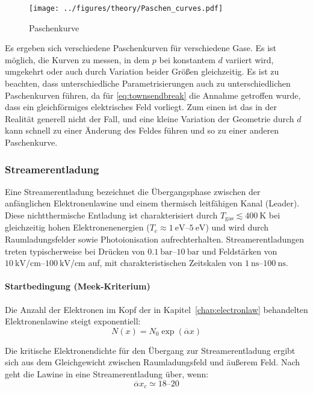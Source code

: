   \begin{figure}[htbp]
    \centering
    \texttt{[image: ../figures/theory/Paschen\_curves.pdf]}
    \caption{Paschenkurve}
    \label{fig:paschencurve}
  \end{figure}

Es ergeben sich verschiedene Paschenkurven für verschiedene Gase. Es ist möglich, die Kurven zu messen, in dem \(p\) bei konstantem \(d\) variiert wird, umgekehrt oder auch durch Variation beider Größen gleichzeitig. Es ist zu beachten, dass unterschiedliche Parametrisierungen auch zu unterschiedlichen Paschenkurven führen, da für \eqref{eq:townsendbreak} die Annahme getroffen wurde, dass ein gleichförmiges elektrisches Feld vorliegt. Zum einen ist das in der Realität generell nicht der Fall, und eine kleine Variation der Geometrie durch \(d\) kann schnell zu einer Änderung des Feldes führen und so zu einer anderen Paschenkurve. \cite{kuffel2000}


\subsubsection{Streamerentladung}
\label{sec:streamerdischarge}
Eine Streamerentladung bezeichnet die Übergangsphase zwischen der anfänglichen Elektronenlawine und einem thermisch leitfähigen Kanal (Leader). Diese nichtthermische Entladung ist charakterisiert durch $T_{\text{gas}} \lesssim \SI{400}{\kelvin}$ bei gleichzeitig hohen Elektronenenergien ($T_e \approx \SIrange{1}{5}{\electronvolt}$) und wird durch Raumladungsfelder sowie Photoionisation aufrechterhalten. Streamerentladungen treten typischerweise bei Drücken von $\SIrange{0.1}{10}{\bar}$ und Feldstärken von $\SIrange{10}{100}{\kilo\volt\per\centi\meter}$ auf, mit charakteristischen Zeitskalen von $\SIrange{1}{100}{\nano\second}$.

\paragraph{Startbedingung (Meek-Kriterium)}
Die Anzahl der Elektronen im Kopf der in Kapitel~\ref{chap:electronlaw} behandelten Elektronenlawine steigt exponentiell:
\begin{equation}
    N(x) = N_0 \exp(\overline{\alpha} x)
\end{equation}

Die kritische Elektronendichte für den Übergang zur Streamerentladung ergibt sich aus dem Gleichgewicht zwischen Raumladungsfeld und äußerem Feld. Nach \textcite{meek1940} geht die Lawine in eine Streamerentladung über, wenn:
\begin{equation}
    \overline{\alpha} x_c \simeq 18\text{--}20
    \label{eq:meek}
\end{equation}

